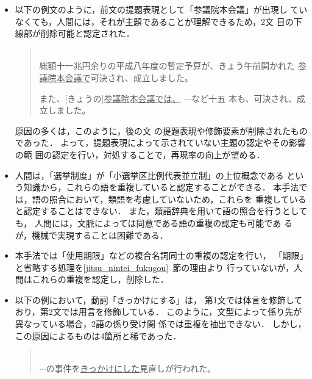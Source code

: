 \begin{itemize}
 \item 以下の例文のように，前文の提題表現として「参議院本会議」が出現し
       ていなくても，人間には，それが主題であることが理解できるため，2文
       目の下線部が削除可能と認定された．
      \vspace{5mm} \begin{quote}\label{rei:rei16}
	\hspace*{-1em}{\bf 例16：}\\
	総額十一兆円余りの平成八年度の暫定予算が、きょう午前開かれた
	\underline{参議院本会議で}可決され、成立しました。

	また、[きょうの]\underline{参議院本会議では、}\ $\cdots$など十五
	本も、可決され、成立しました。
       \end{quote}\vspace{5mm}
       原因の多くは，このように，後の文
       の提題表現や修飾要素が削除されたものであった．
       よって，提題表現によって示されていない主題の認定やその影響の範
       囲の認定を行い，対処することで，再現率の向上が望める．
 \item 人間は，「選挙制度」が「小選挙区比例代表並立制」の上位概念である
       という知識から，これらの語を重複していると認定することができる．
       本手法では，語の照合において，類語を考慮していないため，これらを
       重複していると認定することはできない．
       また，類語辞典を用いて語の照合を行うとしても，
       人間には，文脈によっては同意である語の重複の認定も可能であ
       るが，機械で実現することは困難である．
 \item 本手法では「使用期限」などの複合名詞同士の重複の認定を行い，
       「期限」と省略する処理を\ref{jitsu_nintei_fukugou}~節の理由より
       行っていないが，人間はこれらの重複を認定し，削除した．
 \item 以下の例において，動詞「きっかけにする」は，
       第1文では体言を修飾しており，第2文では用言を修飾している．
       このように，文型によって係り先が異なっている場合，2語の係り受け関
       係では重複を抽出できない．
       しかし，この原因によるものは4箇所と稀であった．
\vspace{5mm}       \begin{quote}\label{rei:rei17}
	\hspace*{-1em}{\bf 例17：}\\
	$\cdots$の事件を\underline{きっかけにした}見直しが行われた。


\end{quote}
\end{itemize}
